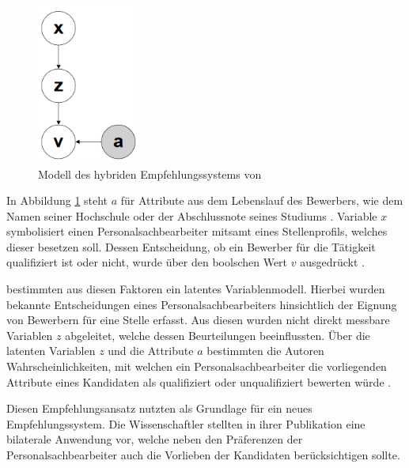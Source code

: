 \begin{figure}[h]
	\centering
	\includegraphics[width=0.3\textwidth]{gfx/faerber.png}
	\caption{Modell des hybriden Empfehlungssystems von \textcite[S. 8]{faerber:2003}}
	\label{fig:verwandteArbeiten:abb1}
\end{figure}

In Abbildung \ref{fig:verwandteArbeiten:abb1} steht $a$ für Attribute aus dem Lebenslauf des Bewerbers, wie dem Namen seiner Hochschule oder der Abschlussnote seines Studiums \cite[S. 4]{malinowski:2006}. Variable $x$ symbolisiert einen Personalsachbearbeiter mitsamt eines Stellenprofils, welches dieser besetzen soll. Dessen Entscheidung, ob ein Bewerber für die Tätigkeit qualifiziert ist oder nicht, wurde über den boolschen Wert $v$ ausgedrückt \cite[S. 6ff.]{faerber:2003}.

\textcite[S. 4ff.]{faerber:2003} bestimmten aus diesen Faktoren ein latentes Variablenmodell. Hierbei wurden bekannte Entscheidungen eines Personalsachbearbeiters hinsichtlich der Eignung von Bewerbern für eine Stelle erfasst. Aus diesen wurden nicht direkt messbare Variablen $z$ abgeleitet, welche dessen Beurteilungen beeinflussten. Über die latenten Variablen $z$ und die Attribute $a$ bestimmten die Autoren Wahrscheinlichkeiten, mit welchen ein Personalsachbearbeiter die vorliegenden Attribute eines Kandidaten als qualifiziert oder unqualifiziert bewerten würde \cite[S. 4ff.]{faerber:2003}.

Diesen Empfehlungsansatz nutzten \textcite[S. 4f.]{malinowski:2006} als Grundlage für ein neues Empfehlungssystem. Die Wissenschaftler stellten in ihrer Publikation eine bilaterale Anwendung vor, welche neben den Präferenzen der Personalsachbearbeiter auch die Vorlieben der Kandidaten berücksichtigen sollte.

